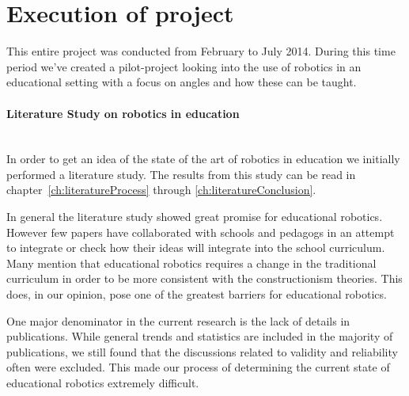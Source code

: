 \section{Execution of project}
This entire project was conducted from February to July 2014. During this time period we've created a pilot-project looking into the use of robotics in an educational setting with a focus on angles and how these can be taught.
%

\paragraph{Literature Study on robotics in education}~\\	
In order to get an idea of the state of the art of robotics in education we initially performed a literature study. The results from this study can be read in chapter~\ref{ch:literatureProcess} through \ref{ch:literatureConclusion}.

\bigskip\noindent
In general the literature study showed great promise for educational robotics. However few papers have collaborated with schools and pedagogs in an attempt to integrate or check how their ideas will integrate into the school curriculum. Many mention that educational robotics requires a change in the traditional curriculum in order to be more consistent with the constructionism theories. This does, in our opinion, pose one of the greatest barriers for educational robotics.

\bigskip\noindent
One major denominator in the current research is the lack of details in publications. While general trends and statistics are included in the majority of publications, we still found that the discussions related to validity and reliability often were excluded. This made our process of determining the current state of educational robotics extremely difficult. 


